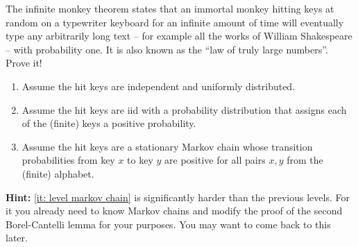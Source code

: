 
\begin{exercise}[subtitle={Infinite Monkey Theorem \Coffeecup\Coffeecup}]
    The infinite monkey theorem states that an immortal monkey hitting keys at
    random on a typewriter keyboard for an infinite amount of time will
    eventually type any arbitrarily long text -- for example all the
    works of William Shakespeare -- with probability one.  It is also known as
    the ``law of truly large numbers''.
    Prove it!
    \begin{enumerate}[label={\emph{Level \arabic*:}},ref={Level \arabic*},leftmargin=4em,noitemsep]
        \item Assume the hit keys are independent and uniformly distributed.
        \item\label{it: level iid} Assume the hit keys are iid with a probability distribution that
        assigns each of the (finite) keys a positive probability.
        \item\label{it: level markov chain} Assume the hit keys are a stationary Markov chain whose transition
        probabilities from key \(x\) to key \(y\) are positive for all pairs
        \(x,y\) from the (finite) alphabet.
    \end{enumerate}
    \textbf{Hint:} \ref{it: level markov chain} is significantly harder than
    the previous levels. For it you already need to know Markov chains
    and modify the proof of the second Borel-Cantelli lemma for your purposes.
    You may want to come back to this later.
\end{exercise}

